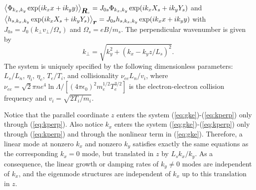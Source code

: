 \documentclass[12pt,superscriptaddress]{revtex4}
\newcommand{\vect}[1]{\mbox{\boldmath $#1$}}
\newcommand{\nuee}{\nu_{ee}}
\begin{document}
$\left<\Phi_{k_x,k_y} \exp(i k_x x + i k_y y)\right>_{\vect{R}_s}
=J_{0s} \Phi_{k_x,k_y} \exp(i k_x X_s + i k_y Y_s)$
and
$\left<h_{s,k_x,k_y}\exp(i k_x X_s + i k_y Y_s)\right>_{\vect{r}} = J_{0s} h_{s,k_x,k_y}\exp(i k_x x + i k_y y)$
with $J_{0s} = J_0(k_{\perp} v_{\perp} / \Omega_s)$
and $\Omega_s = e B/m_s$.
The perpendicular wavenumber is given by
\begin{equation}
k_{\perp} = \sqrt{k_y^2 + (k_x - k_y z/L_s)^2}.
\label{eq:kperp}
\end{equation}
The system is uniquely specified by the following dimensionless parameters:
$L_s / L_n$, $\eta_i$, $\eta_e$, $T_e / T_i$, and collisionality $\nuee L_n / v_i$,
where $\nuee = \sqrt{2}\pi n e^4 \ln\Lambda/[(4\pi\epsilon_0)^2 m_e^{1/2} T_e^{3/2}]$ is the electron-electron collision frequency
and $v_i = \sqrt{2 T_i / m_i}$.

Notice that the parallel coordinate $z$ enters the system (\ref{eq:gke})-(\ref{eq:kperp}) only through (\ref{eq:kperp}).
Also notice $k_x$ enters the system (\ref{eq:gke})-(\ref{eq:kperp}) only through (\ref{eq:kperp}) and through the nonlinear term in (\ref{eq:gke}).
Therefore, a linear mode at nonzero $k_x$ and nonzero $k_y$ satisfies exactly the same equations as the corresponding $k_x=0$ mode, but translated in $z$ by
$L_s k_x / k_y$.  As a consequence, the linear growth or damping rates of $k_y \ne 0$ modes
are independent of $k_x$, and the eigenmode structures are independent of $k_x$
up to this translation in $z$.
\end{document}
